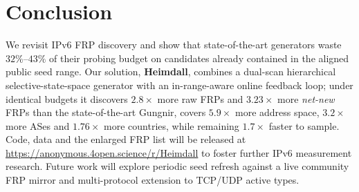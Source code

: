 \documentclass[conference]{IEEEtran}
\begin{document}
\section{Conclusion}\label{sec:conclusion}
We revisit IPv6 FRP discovery and show that state-of-the-art
generators waste $32\%$--$43\%$ of their probing budget on
candidates already contained in the aligned public seed range.
Our solution, \textbf{Heimdall}, combines a dual-scan hierarchical
selective-state-space generator with an in-range-aware online
feedback loop; under identical budgets it discovers
$2.8\times$ more raw FRPs and $3.23\times$ more \emph{net-new}
FRPs than the state-of-the-art Gungnir, covers $5.9\times$
more address space, $3.2\times$ more ASes and $1.76\times$
more countries, while remaining $1.7\times$ faster to sample.
Code, data and the enlarged FRP list will be released at
\url{https://anonymous.4open.science/r/Heimdall} to foster further
IPv6 measurement research.  Future work will explore periodic
seed refresh against a live community FRP mirror and
multi-protocol extension to TCP/UDP active types.
\end{document}

